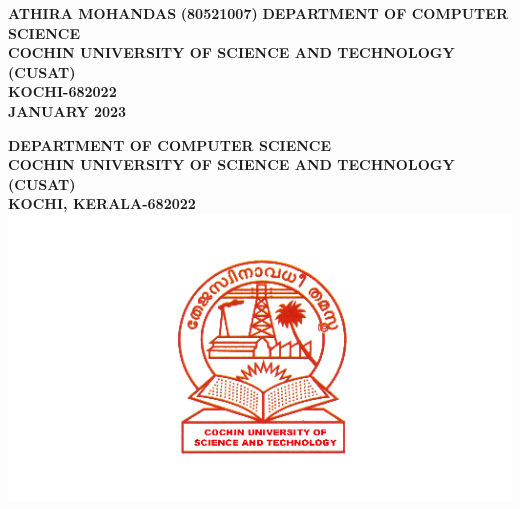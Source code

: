 \documentclass[a4paper,12pt]{report}
\begin{document}
\begin{center}
		\textbf{ATHIRA MOHANDAS\hspace{600pt}}
		\vspace*{20pt}
		\textbf{(80521007) \hspace{300pt}}
		\vspace*{0pt}
		\small\textbf{DEPARTMENT OF COMPUTER SCIENCE\\}
		\small\textbf{COCHIN UNIVERSITY OF SCIENCE AND TECHNOLOGY (CUSAT)\\}
		\small\textbf{KOCHI-682022\\}
		\vspace{10pt}
		\small\textbf{JANUARY 2023}
		
		
		
	\end{center}
	\newpage
	\thispagestyle{empty}
	
	
	\begin{center}
		\large\textbf{DEPARTMENT OF COMPUTER SCIENCE\\}
		\small\textbf{COCHIN UNIVERSITY OF SCIENCE AND TECHNOLOGY (CUSAT)\\}
		\small\textbf{KOCHI, KERALA-682022\\}
		\vspace*{20pt}
		\includegraphics[scale=0.5]{cusat.png}
		\vspace*{20pt}
	\end{center}
	\vspace{15pt}
	
\end{document}

